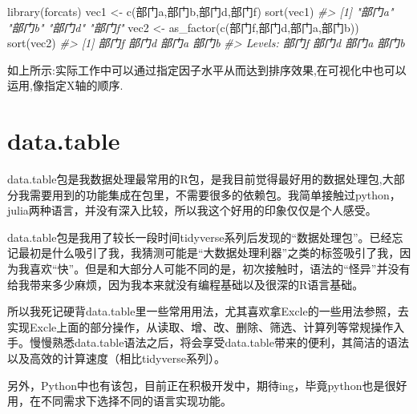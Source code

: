 \documentclass[
]{book}
\newenvironment{Shaded}{\begin{snugshade}}{\end{snugshade}}
\newcommand{\CommentTok}[1]{\textcolor[rgb]{0.56,0.35,0.01}{\textit{#1}}}
\newcommand{\FunctionTok}[1]{\textcolor[rgb]{0.00,0.00,0.00}{#1}}
\newcommand{\NormalTok}[1]{#1}
\newcommand{\OtherTok}[1]{\textcolor[rgb]{0.56,0.35,0.01}{#1}}
\newcommand{\StringTok}[1]{\textcolor[rgb]{0.31,0.60,0.02}{#1}}
\begin{document}
\begin{Shaded}
\begin{Highlighting}[]
\FunctionTok{library}\NormalTok{(forcats)}
\NormalTok{vec1 }\OtherTok{\textless{}{-}} \FunctionTok{c}\NormalTok{(}\StringTok{\textquotesingle{}部门a\textquotesingle{}}\NormalTok{,}\StringTok{\textquotesingle{}部门b\textquotesingle{}}\NormalTok{,}\StringTok{\textquotesingle{}部门d\textquotesingle{}}\NormalTok{,}\StringTok{\textquotesingle{}部门f\textquotesingle{}}\NormalTok{)}
\FunctionTok{sort}\NormalTok{(vec1)}
\CommentTok{\#\textgreater{} [1] "部门a" "部门b" "部门d" "部门f"}
\NormalTok{vec2 }\OtherTok{\textless{}{-}} \FunctionTok{as\_factor}\NormalTok{(}\FunctionTok{c}\NormalTok{(}\StringTok{\textquotesingle{}部门f\textquotesingle{}}\NormalTok{,}\StringTok{\textquotesingle{}部门d\textquotesingle{}}\NormalTok{,}\StringTok{\textquotesingle{}部门a\textquotesingle{}}\NormalTok{,}\StringTok{\textquotesingle{}部门b\textquotesingle{}}\NormalTok{))}
\FunctionTok{sort}\NormalTok{(vec2)}
\CommentTok{\#\textgreater{} [1] 部门f 部门d 部门a 部门b}
\CommentTok{\#\textgreater{} Levels: 部门f 部门d 部门a 部门b}
\end{Highlighting}
\end{Shaded}

如上所示:实际工作中可以通过指定因子水平从而达到排序效果,在可视化中也可以运用,像指定X轴的顺序.

\hypertarget{data.table}{%
\chapter{data.table}\label{data.table}}

data.table包是我数据处理最常用的R包，是我目前觉得最好用的数据处理包,大部分我需要用到的功能集成在包里，不需要很多的依赖包。我简单接触过python，julia两种语言，并没有深入比较，所以我这个好用的印象仅仅是个人感受。

data.table包是我用了较长一段时间tidyverse系列后发现的``数据处理包''。已经忘记最初是什么吸引了我，我猜测可能是``大数据处理利器''之类的标签吸引了我，因为我喜欢``快''。但是和大部分人可能不同的是，初次接触时，语法的``怪异''并没有给我带来多少麻烦，因为我本来就没有编程基础以及很深的R语言基础。

所以我死记硬背data.table里一些常用用法，尤其喜欢拿Excle的一些用法参照，去实现Excle上面的部分操作，从读取、增、改、删除、筛选、计算列等常规操作入手。慢慢熟悉data.table语法之后，将会享受data.table带来的便利，其简洁的语法以及高效的计算速度（相比tidyverse系列）。

另外，Python中也有该包，目前正在积极开发中，期待ing，毕竟python也是很好用，在不同需求下选择不同的语言实现功能。
\end{document}
